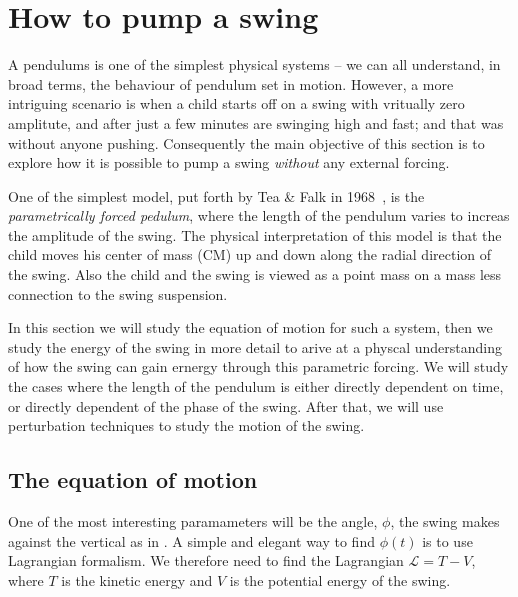 \documentclass[11pt,letter, swedish, english
]{article}
\begin{document}





\section{How to pump a swing}
A pendulums is one of the simplest physical systems -- we can all
understand, in broad terms, the behaviour of pendulum set in
motion. However, a more intriguing scenario is when a child starts off
on a swing with vritually zero amplitute, and after just a few minutes
are swinging high and fast; and that was without anyone pushing.
Consequently the main objective of this section is to explore how it
is possible to pump a swing \emph{without} any external forcing. 

One of the simplest model, put forth by Tea \& Falk in
1968~\cite{Tea_Falk_1968}, is the \emph{parametrically forced
  pedulum}, where the length of the pendulum varies to increas the
amplitude of the swing. The physical interpretation of this model is
that the child moves his center of mass (CM) up and down along the radial
direction of the swing. Also the child and the swing is viewed as a
point mass on a mass less connection to the swing suspension. 

In this section we will study the equation of motion for such a system,
then we study the energy of the swing in more detail to arive at a
physcal understanding of how the swing can gain ernergy through this
parametric forcing. We will study the cases where the length of the
pendulum is either directly dependent on time, or directly dependent
of the phase of the swing.
After that, we will use 
perturbation techniques to study the motion of the swing.

\subsection{The equation of motion}
One of the most interesting paramameters will be the angle, $\phi$,
the swing makes against the vertical as in . 
A simple and elegant way to find $\phi(t)$ is to use Lagrangian
formalism. We therefore need to find the Lagrangian $\mathcal{L}=T-V$,
where $T$ is the kinetic energy and $V$ is the potential energy of the
swing. 
\end{document}
